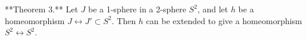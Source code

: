 **Theorem 3.** Let $J$ be a 1-sphere in a 2-sphere $S^2$, and let $h$ be a homeomorphism $J \leftrightarrow J' \subset S^2$. Then $h$ can be extended to give a homeomorphism $S^2 \leftrightarrow S^2$.
